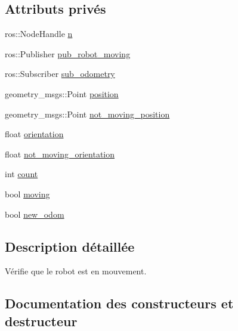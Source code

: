 \subsection*{Attributs privés}
\begin{DoxyCompactItemize}
\item 
ros\+::\+Node\+Handle \hyperlink{classrobot__moving__lectures_a82552b8a3b185283febb51fceac11aad}{n}
\item 
ros\+::\+Publisher \hyperlink{classrobot__moving__lectures_aac8988bf2f9e44849d2ca98bbbdda9ab}{pub\+\_\+robot\+\_\+moving}
\item 
ros\+::\+Subscriber \hyperlink{classrobot__moving__lectures_aaadaf3fdebc47dffb5c8b90faf019b09}{sub\+\_\+odometry}
\item 
geometry\+\_\+msgs\+::\+Point \hyperlink{classrobot__moving__lectures_ae6187e99da86dd6b41c5052278a84d93}{position}
\item 
geometry\+\_\+msgs\+::\+Point \hyperlink{classrobot__moving__lectures_a64795c4c36e3297d78c3a4a89010a07f}{not\+\_\+moving\+\_\+position}
\item 
float \hyperlink{classrobot__moving__lectures_a8dec7729789a291520b1da07550cfc1b}{orientation}
\item 
float \hyperlink{classrobot__moving__lectures_a72e1bcf012f8491fbb695516c8d74d5a}{not\+\_\+moving\+\_\+orientation}
\item 
int \hyperlink{classrobot__moving__lectures_ac470bc68819e9de23d97c8d5024e69eb}{count}
\item 
bool \hyperlink{classrobot__moving__lectures_aa045b2d358ed1da9911eb1bcaa5a58ea}{moving}
\item 
bool \hyperlink{classrobot__moving__lectures_a1bdd03baed3531faaee9dd857bd5d6ce}{new\+\_\+odom}
\end{DoxyCompactItemize}


\subsection{Description détaillée}
Vérifie que le robot est en mouvement. 

\subsection{Documentation des constructeurs et destructeur}
